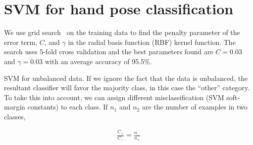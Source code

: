 \section{SVM for hand pose classification}
We use grid search~\cite{hsu10} on the training data to find the penalty
parameter of the error term, $C$, and $\gamma$ in the radial basis function (RBF) kernel function. 
The search uses 5-fold cross validation and the best parameters found are $C =
0.03$ and $\gamma = 0.03$ with an average accuracy of 95.5\%.

SVM for unbalanced data. \cite{ben2010}
If we ignore the  fact that the data is unbalanced, the resultant classifier
will favor the majority class, in this case the ``other'' category. To take this
into account, we can assign different misclassification (SVM soft-margin
constants) to each class. If $n_1$ and $n_2$ are the number of examples in two
classes, 

\begin{align}
\frac{C_+}{C_-} = \frac{n_-}{n_+}
\end{align}

